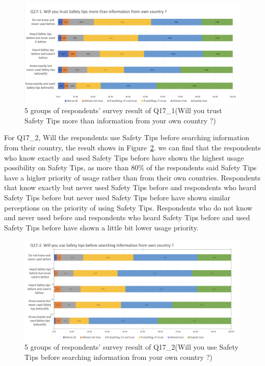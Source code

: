 \begin{figure}[h]
  \includegraphics[width=0.8\linewidth]{Figure/Figure19.jpg}
  \centering
  \caption[5 groups of respondents' survey result of Q17\_1]{5 groups of respondents' survey result of Q17\_1(Will you trust Safety Tips more than information from your own country ?)}
  \label{fig19}
\end{figure}

For Q17\_2, Will the respondents use Safety Tips before searching information from their country, the result shows in Figure~\ref{fig20}. we can find that the respondents who know exactly and used Safety Tips before have shown the highest usage possibility on Safety Tips, as more than 80\% of the respondents said Safety Tips have a higher priority of usage rather than from their own countries. Respondents that know exactly but never used Safety Tips before and respondents who heard Safety Tips before but never used Safety Tips before have shown similar perceptions on the priority of using Safety Tips. Respondents who do not know and never used before and respondents who heard Safety Tips before and used Safety Tips before have shown a little bit lower usage priority. 

\begin{figure}[h]
  \includegraphics[width=0.8\linewidth]{Figure/Figure20.jpg}
  \centering
  \caption[5 groups of respondents' survey result of Q17\_2]{5 groups of respondents' survey result of Q17\_2(Will you use Safety Tips before searching information from your own country ?)}
  \label{fig20}
\end{figure}

